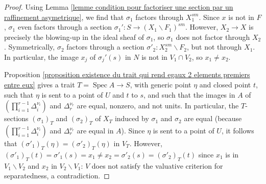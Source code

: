 \documentclass[a4paper,12pt]{amsart} %
\numberwithin{equation}{subsection}
\newcommand{\Spec}{\operatorname{Spec}}
\theoremstyle{definition}
\theoremstyle{plain}%
\theoremstyle{remark}
\begin{document}
\begin{proof}
Using Lemma \ref{lemme condition pour factoriser une section par un raffinement asymetrique}, we find that $\sigma_1$ factors through $X_1^{sm}$. Since $x$ is not in $F$, $\sigma_1$ even factors through a section $\sigma_1'\colon S\to (X_1\backslash F_1)^{sm}$. However, $X_2\to X$ is precisely the blowing-up in the ideal sheaf of $\sigma_1$, so $\sigma_1$ does not factor through $X_2$. Symmetrically, $\sigma_2$ factors through a section $\sigma'_2\colon X_2^{sm}\backslash F_2$, but not through $X_1$. In particular, the image $x_j$ of $\sigma_j'(s)$ in $N$ is not in $V_1\cap V_2$, so $x_1\neq x_2$.

Proposition \ref{proposition existence du trait qui rend egaux 2 elements premiers entre eux} gives a trait $T=\Spec A\to S$, with generic point $\eta$ and closed point $t$, such that $\eta$ is sent to a point of $U$ and $t$ to $s$, and such that the images in $A$ of $\left(\prod\limits_{i=1}^{r-1}\Delta_i^{\nu_i}\right)$ and $\Delta_r^{\nu_r}$ are equal, nonzero, and not units. In particular, the $T$-sections $(\sigma_1)_T$ and $(\sigma_2)_T$ of $X_T$ induced by $\sigma_1$ and $\sigma_2$ are equal (because $\left(\prod\limits_{i=1}^{r-1}\Delta_i^{\nu_i}\right)$ and $\Delta_r^{\nu_r}$ are equal in $A$). Since $\eta$ is sent to a point of $U$, it follows that $(\sigma'_1)_T(\eta)=(\sigma'_2)_T(\eta)$ in $V_T$. However, $(\sigma'_1)_T(t)=\sigma'_1(s)=x_1\neq x_2=\sigma'_2(s)=(\sigma'_2)_T(t)$ since $x_1$ is in $V_1\backslash V_2$ and $x_2$ in $V_2\backslash V_1$: $V$ does not satisfy the valuative criterion for separatedness, a contradiction.
\end{proof}
\end{document}
